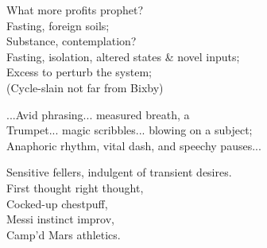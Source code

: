 What more profits prophet? \\
Fasting, foreign soils; \\
Substance, contemplation? \\
Fasting, isolation, altered states \& novel inputs; \\
Excess to perturb the system; \\
(Cycle-slain not far from Bixby)

...Avid phrasing... measured breath, a \\
Trumpet... magic scribbles... blowing on a subject; \\
Anaphoric rhythm, vital dash, and speechy pauses...

Sensitive fellers, indulgent of transient desires. \\
First thought right thought, \\
Cocked-up chestpuff, \\
Messi instinct improv, \\ 
Camp'd Mars athletics.
